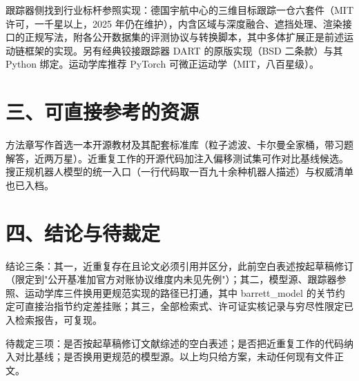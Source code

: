 \documentclass{article}
\begin{document}
跟踪器侧找到行业标杆参照实现：德国宇航中心的三维目标跟踪一仓六套件（MIT 许可，一千星以上，2025 年仍在维护），内含区域与深度融合、遮挡处理、渲染接口的正规写法，附各公开数据集的评测协议与转换脚本，其中多体扩展正是前述运动链框架的实现。另有经典铰接跟踪器 DART 的原版实现（BSD 二条款）与其 Python 绑定。运动学库推荐 PyTorch 可微正运动学（MIT，八百星级）。

\section{三、可直接参考的资源}
方法章写作首选一本开源教材及其配套标准库（粒子滤波、卡尔曼全家桶，带习题解答，近两万星）。近重复工作的开源代码加注入偏移测试集可作对比基线候选。搜正规机器人模型的统一入口（一行代码取一百九十余种机器人描述）与权威清单也已入档。

\section{四、结论与待裁定}
结论三条：其一，近重复存在且论文必须引用并区分，此前空白表述按起草稿修订（限定到"公开基准加官方对账协议维度内未见先例"）；其二，模型源、跟踪器参照、运动学库三件换用更规范实现的路径已打通，其中 barrett\_model 的关节约定可直接治指节约定差挂账；其三，全部检索式、许可证实核记录与穷尽性限定已入检索报告，可复现。

待裁定三项：是否按起草稿修订文献综述的空白表述；是否把近重复工作的代码纳入对比基线；是否换用更规范的模型源。以上均只给方案，未动任何现有文件正文。
\end{document}
